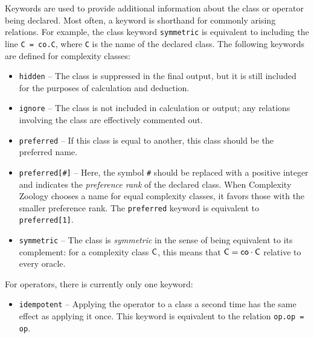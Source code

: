 Keywords are used to provide additional information about the class or
operator being declared. Most often, a keyword is shorthand for commonly
arising relations. For example, the class keyword \texttt{symmetric} is
equivalent to including the line \texttt{C = co.C}, where \texttt{C} is the
name of the declared class. The following keywords are defined for complexity
classes:
\begin{itemize}
\item \texttt{hidden} -- The class is suppressed in the final output, but it is
  still included for the purposes of calculation and deduction.
\item \texttt{ignore} -- The class is not included in calculation or output;
  any relations involving the class are effectively commented out.
\item \texttt{preferred} -- If this class is equal to another, this class should
  be the preferred name.
\item \texttt{preferred[\#]} -- Here, the symbol \texttt{\#} should be replaced
  with a positive integer and indicates the \textit{preference rank} of the
  declared class. When Complexity Zoology chooses a name for equal complexity
  classes, it favors those with the smaller preference rank. The
  \texttt{preferred} keyword is equivalent to \texttt{preferred[1]}.
\item \texttt{symmetric} -- The class is \textit{symmetric} in the sense of
  being equivalent to its complement: for a complexity class $\mathsf{C}$, this means
  that $\mathsf{C}=\mathsf{co}\cdot\mathsf{C}$ relative to every oracle.
\end{itemize}
For operators, there is currently only one keyword:
\begin{itemize}
\item \texttt{idempotent} -- Applying the operator to a class a second time has
  the same effect as applying it once. This keyword is equivalent to the
  relation \texttt{op.op = op}.
\end{itemize}


